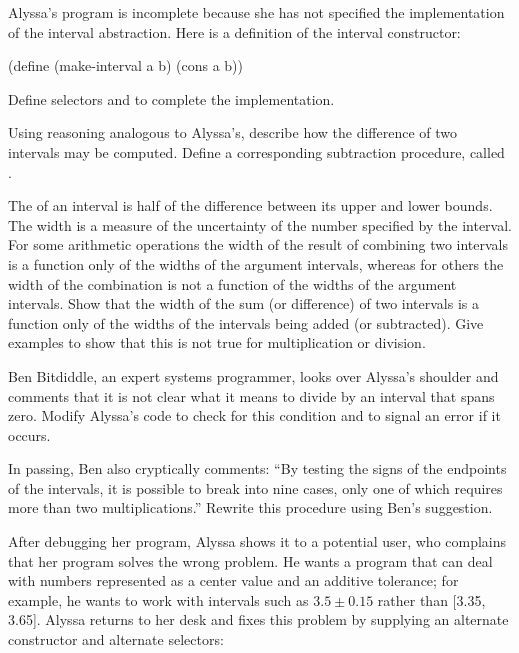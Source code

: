 \begin{exerciseGroup}
\label{Exercise 2.7}
 Alyssa's program is incomplete
because she has not specified the implementation of the interval abstraction.
Here is a definition of the interval constructor:

\begin{codeBlock}
(define (make-interval a b) (cons a b))
\end{codeBlock}

Define selectors  and  to complete the
implementation.

\label{Exercise 2.8}
 Using reasoning analogous to
Alyssa's, describe how the difference of two intervals may be computed.  Define
a corresponding subtraction procedure, called .

\label{Exercise 2.9}
 The  of an interval
is half of the difference between its upper and lower bounds.  The width is a
measure of the uncertainty of the number specified by the interval.  For some
arithmetic operations the width of the result of combining two intervals is a
function only of the widths of the argument intervals, whereas for others the
width of the combination is not a function of the widths of the argument
intervals.  Show that the width of the sum (or difference) of two intervals is
a function only of the widths of the intervals being added (or subtracted).
Give examples to show that this is not true for multiplication or division.

\label{Exercise 2.10}
 Ben Bitdiddle, an expert systems
programmer, looks over Alyssa's shoulder and comments that it is not clear what
it means to divide by an interval that spans zero.  Modify Alyssa's code to
check for this condition and to signal an error if it occurs.

\label{Exercise 2.11}
 In passing, Ben also cryptically
comments: ``By testing the signs of the endpoints of the intervals, it is
possible to break  into nine cases, only one of which
requires more than two multiplications.''  Rewrite this procedure using Ben's
suggestion.

After debugging her program, Alyssa shows it to a potential user, who complains
that her program solves the wrong problem.  He wants a program that can deal
with numbers represented as a center value and an additive tolerance; for
example, he wants to work with intervals such as \( 3.5 \pm 0.15 \) rather than
[3.35, 3.65].  Alyssa returns to her desk and fixes this problem by supplying
an alternate constructor and alternate selectors:


\end{exerciseGroup}
